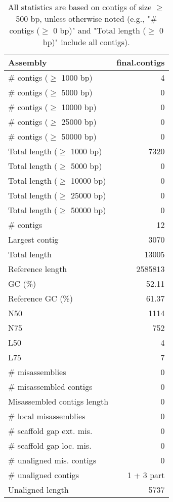 \documentclass[12pt,a4paper]{article}
\begin{document}
\begin{table}[ht]
\begin{center}
\caption{All statistics are based on contigs of size $\geq$ 500 bp, unless otherwise noted (e.g., "\# contigs ($\geq$ 0 bp)" and "Total length ($\geq$ 0 bp)" include all contigs).}
\begin{tabular}{|l*{1}{|r}|}
\hline
Assembly & final.contigs \\ \hline
\# contigs ($\geq$ 1000 bp) & 4 \\ \hline
\# contigs ($\geq$ 5000 bp) & 0 \\ \hline
\# contigs ($\geq$ 10000 bp) & 0 \\ \hline
\# contigs ($\geq$ 25000 bp) & 0 \\ \hline
\# contigs ($\geq$ 50000 bp) & 0 \\ \hline
Total length ($\geq$ 1000 bp) & 7320 \\ \hline
Total length ($\geq$ 5000 bp) & 0 \\ \hline
Total length ($\geq$ 10000 bp) & 0 \\ \hline
Total length ($\geq$ 25000 bp) & 0 \\ \hline
Total length ($\geq$ 50000 bp) & 0 \\ \hline
\# contigs & 12 \\ \hline
Largest contig & 3070 \\ \hline
Total length & 13005 \\ \hline
Reference length & 2585813 \\ \hline
GC (\%) & 52.11 \\ \hline
Reference GC (\%) & 61.37 \\ \hline
N50 & 1114 \\ \hline
N75 & 752 \\ \hline
L50 & 4 \\ \hline
L75 & 7 \\ \hline
\# misassemblies & 0 \\ \hline
\# misassembled contigs & 0 \\ \hline
Misassembled contigs length & 0 \\ \hline
\# local misassemblies & 0 \\ \hline
\# scaffold gap ext. mis. & 0 \\ \hline
\# scaffold gap loc. mis. & 0 \\ \hline
\# unaligned mis. contigs & 0 \\ \hline
\# unaligned contigs & 1 + 3 part \\ \hline
Unaligned length & 5737 \\ \hline

\end{tabular}
\end{center}
\end{table}
\end{document}
